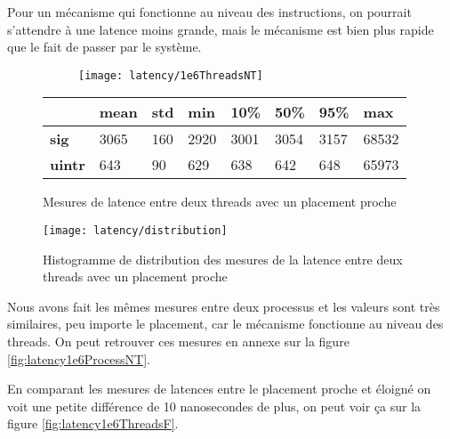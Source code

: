 Pour un mécanisme qui fonctionne au niveau des instructions, on pourrait s'attendre à une latence moins grande,
mais le mécanisme est bien plus rapide que le fait de passer par le système.

\begin{figure}[H]
  \begin{subfigure}{\textwidth}
    \texttt{[image: latency/1e6ThreadsNT]}
    \caption{}
    \label{subfig:latency1e6ThreadsNT}
  \end{subfigure}
  \begin{subtable}{\textwidth}
    \centering
    \begin{tabular}{| l | l | l | l | l | l | l | l |}
      \hline
      &\bf mean &\bf std &\bf min  &\bf 10\% &\bf 50\% &\bf 95\% &\bf max\\
      \hline
      \bf sig   & 3065 & 160 & 2920 & 3001 & 3054 & 3157 & 68532\\
      \hline
      \bf uintr & 643  & 90  & 629  & 638  & 642  & 648  & 65973\\
      \hline
    \end{tabular}
    \caption{}
    \label{tab:latency1e6ThreadsNT}
  \end{subtable}
  \caption{Mesures de latence entre deux threads avec un placement proche}
  \label{fig:latency1e6ThreadsNT}
\end{figure}

\begin{figure}[H]
  \texttt{[image: latency/distribution]}
  \caption{Histogramme de distribution des mesures de la latence entre deux threads avec un placement proche}
  \label{fig:distribution}
\end{figure}

Nous avons fait les mêmes mesures entre deux processus et les valeurs sont très similaires, peu importe le placement,
car le mécanisme fonctionne au niveau des threads.
On peut retrouver ces mesures en annexe sur la figure \ref{fig:latency1e6ProcessNT}.

En comparant les mesures de latences entre le placement proche et éloigné on voit une petite différence de 10 nanosecondes de plus,
on peut voir ça sur la figure \ref{fig:latency1e6ThreadsF}.

